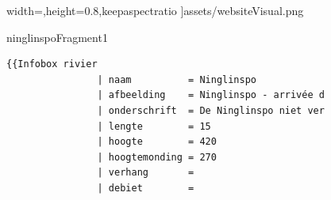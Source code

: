 \documentclass[presentatie.tex]{subfiles}
\begin{document}
\begin{frame}
{{{                        width=\linewidth,height=0.8\textheight,keepaspectratio
                    ]{assets/websiteVisual.png}%
                }
            }
            \fi
        }
    \end{frame}

    \begin{saveblock}{ninglinspoFragment1}
        \begin{Verbatim}[tabsize=4,gobble=8]
        {{Infobox rivier
                | naam          = Ninglinspo
                | afbeelding    = Ninglinspo - arrivée d
                | onderschrift  = De Ninglinspo niet ver
                | lengte        = 15
                | hoogte        = 420
                | hoogtemonding = 270
                | verhang       = 
                | debiet        = 
        \end{Verbatim}
    \end{saveblock}
\end{document}
